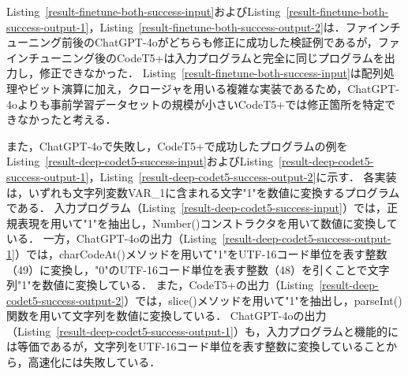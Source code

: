 \documentclass[11pt]{jreport}
\newcommand{\fixtwo}[1]{#1}
\begin{document}
Listing~\ref{result-finetune-both-success-input}およびListing~\ref{result-finetune-both-success-output-1}，Listing~\ref{result-finetune-both-success-output-2}は．ファインチューニング前後のChatGPT-4oがどちらも修正に成功した検証例であるが，\fixtwo{ファインチューニング後の}CodeT5+は入力プログラムと完全に同じプログラムを出力し，修正できなかった．
Listing~\ref{result-finetune-both-success-input}は配列処理やビット演算に加え，クロージャを用いる複雑な実装であるため，ChatGPT-4oよりも事前学習データセットの規模が小さいCodeT5+では修正箇所を特定できなかったと考える．

また，ChatGPT-4oで失敗し，CodeT5+で成功したプログラムの例をListing~\ref{result-deep-codet5-success-input}およびListing~\ref{result-deep-codet5-success-output-1}，Listing~\ref{result-deep-codet5-success-output-2}に示す．
各実装は，いずれも文字列変数VAR\_1に含まれる文字"1"を数値に変換するプログラムである．
入力プログラム（Listing~\ref{result-deep-codet5-success-input}）では，正規表現を用いて"1"を抽出し，Number()コンストラクタを用いて数値に変換している．
一方，ChatGPT-4oの出力（Listing~\ref{result-deep-codet5-success-output-1}）では，charCodeAt()メソッドを用いて"1"をUTF-16コード単位を表す整数（49）に変換し，"0"のUTF-16コード単位を表す整数（48）を引くことで文字列"1"を数値に変換している．
また，CodeT5+の出力（Listing~\ref{result-deep-codet5-success-output-2}）では，slice()メソッドを用いて"1"を抽出し，parseInt()関数を用いて文字列を数値に変換している．
ChatGPT-4oの出力（Listing~\ref{result-deep-codet5-success-output-1}）も，入力プログラムと機能的には等価であるが，文字列をUTF-16コード単位を表す整数に変換していることから，高速化には失敗している．
\end{document}
